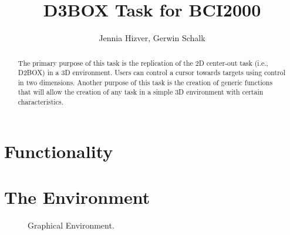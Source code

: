 \documentclass[letterpaper,oneside,12pt]{article}
\begin{document}
%
\title{D3BOX Task for BCI2000}
\author{Jennia Hizver, Gerwin Schalk}
\maketitle

\newpage
\tableofcontents

\newpage 

\begin{abstract}

The primary purpose of this task is the replication of the 2D center-out task 
(i.e., D2BOX) in a 3D environment. Users can control a cursor towards targets 
using control in two dimensions. Another purpose of this task is the creation of 
generic functions that will allow the creation of any task in a simple 3D 
environment with certain characteristics.

\end{abstract}

\newpage
\section{Functionality}


\newpage
\section{The Environment}

\begin{figure}[ht]
 \centerline{}
 \caption{Graphical Environment.}
 \label{fig:environment}
\end{figure}
\end{document}
